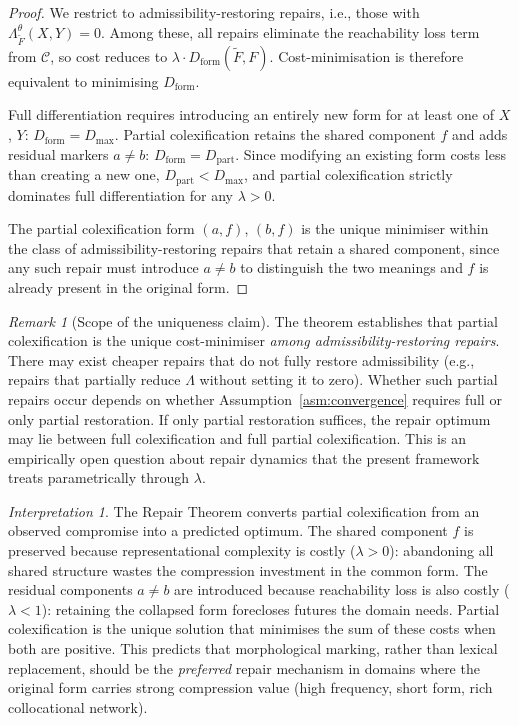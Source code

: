 \documentclass[12pt]{article}
\theoremstyle{rthm}
\theoremstyle{rdef}
\theoremstyle{remark}
\newtheorem*{remark}{Remark}
\newtheorem*{interpretation}{Interpretation}
\newcommand{\Ftil}{\widetilde{F}}
\begin{document}
\begin{proof}
We restrict to admissibility-restoring repairs, i.e., those with
$\Lambda^{\theta}_{\Ftil}(X,Y) = 0$. Among these, all repairs eliminate the
reachability loss term from $\mathcal{C}$, so cost reduces to
$\lambda \cdot D_{\mathrm{form}}(\Ftil, F)$. Cost-minimisation is therefore
equivalent to minimising $D_{\mathrm{form}}$.

Full differentiation requires introducing an entirely new form for at least one
of $X$, $Y$: $D_{\mathrm{form}} = D_{\max}$. Partial colexification retains the
shared component $f$ and adds residual markers $a \neq b$: $D_{\mathrm{form}} =
D_{\mathrm{part}}$. Since modifying an existing form costs less than creating a
new one, $D_{\mathrm{part}} < D_{\max}$, and partial colexification strictly
dominates full differentiation for any $\lambda > 0$.

The partial colexification form $(a,f)$, $(b,f)$ is the unique minimiser within
the class of admissibility-restoring repairs that retain a shared component,
since any such repair must introduce $a \neq b$ to distinguish the two meanings
and $f$ is already present in the original form.
\end{proof}

\begin{remark}[Scope of the uniqueness claim]
The theorem establishes that partial colexification is the unique cost-minimiser
\emph{among admissibility-restoring repairs}. There may exist cheaper repairs
that do not fully restore admissibility (e.g., repairs that partially reduce
$\Lambda$ without setting it to zero). Whether such partial repairs occur depends
on whether Assumption~\ref{asm:convergence} requires full or only partial
restoration. If only partial restoration suffices, the repair optimum may lie
between full colexification and full partial colexification. This is an
empirically open question about repair dynamics that the present framework
treats parametrically through $\lambda$.
\end{remark}

\begin{interpretation}
The Repair Theorem converts partial colexification from an observed compromise
into a predicted optimum. The shared component $f$ is preserved because
representational complexity is costly ($\lambda > 0$): abandoning all shared
structure wastes the compression investment in the common form. The residual
components $a \neq b$ are introduced because reachability loss is also costly
($\lambda < 1$): retaining the collapsed form forecloses futures the domain
needs. Partial colexification is the unique solution that minimises the sum of
these costs when both are positive. This predicts that morphological marking,
rather than lexical replacement, should be the \emph{preferred} repair
mechanism in domains where the original form carries strong compression value
(high frequency, short form, rich collocational network).
\end{interpretation}
\end{document}
